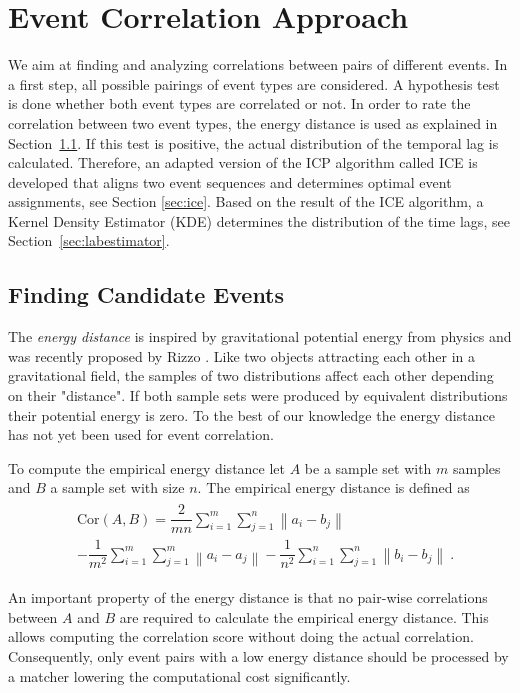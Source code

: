 \documentclass[conference]{IEEEtran}
\theoremstyle{examplestyle}
\begin{document}
\section{Event Correlation Approach}
We aim at finding and analyzing correlations between pairs of different events. In a first step, all possible pairings of event types are considered. A hypothesis test is done whether both event types are correlated or not. In order to rate the correlation between two event types,  the energy distance \cite{Rizzo2016} is used as explained in Section~\ref{sec:energyDistance}. 
If this test is positive, the actual distribution of the temporal lag is calculated. Therefore, an adapted version of the \ac{ICP} algorithm called \ac{ICE} is developed that aligns two event sequences and determines optimal event assignments, see Section \ref{sec:ice}.
Based on the result of the \ac{ICE} algorithm, a Kernel Density Estimator (KDE) determines the distribution of the time lags,  see Section~\ref{sec:labestimator}.




\subsection{Finding Candidate Events}
\label{sec:energyDistance}
The \textit{energy distance} is inspired by gravitational potential energy from physics and was recently proposed by Rizzo \cite{Rizzo2016}. Like two objects attracting each other in a gravitational field, the samples of two distributions affect each other depending on their "distance". If both sample sets were produced by equivalent distributions their potential energy is zero. To the best of our knowledge the energy distance has not yet been used for event correlation.

To compute the empirical energy distance let \(A\) be a sample set with \(m\) samples and \(B\) a sample set with size \(n\). The empirical energy distance is defined as
\begin{align}
\begin{split}
	& \text{Cor}(A, B) = \dfrac{2}{m n} \sum_{i = 1}^m \sum_{j = 1}^n \left\| a_i - b_j \right\| \\
	& - \dfrac{1}{m^2} \sum_{i = 1}^m \sum_{j = 1}^m \left\| a_i - a_j \right\| - \dfrac{1}{n^2} \sum_{i = 1}^n \sum_{j = 1}^n \left\| b_i - b_j \right\| ~.
\end{split}
\end{align}

An important property of the energy distance is that no pair-wise correlations between \(A\) and \(B\) are required to calculate the empirical energy distance. This allows computing the correlation score without doing the actual correlation. Consequently, only event pairs with a low energy distance should be processed by a matcher lowering the computational cost significantly.
\end{document}
